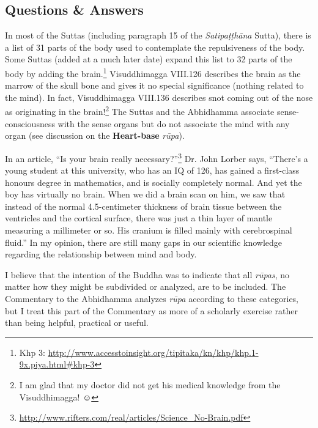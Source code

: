 \newpage

\subsection*{Questions \& Answers}


In most of the Suttas (including paragraph 15 of the \textit{Satipaṭṭhāna} Sutta), there is a list of 31 parts of the body used to contemplate the repulsiveness of the body. Some Suttas (added at a much later date) expand this list to 32 parts of the body by adding the brain.\footnote{Khp 3: \url{http://www.accesstoinsight.org/tipitaka/kn/khp/khp.1-9x.piya.html\#khp-3}} Visuddhimagga VIII.126 describes the brain as the marrow of the skull bone and gives it no special significance (nothing related to the mind). In fact, Visuddhimagga VIII.136 describes snot coming out of the nose as originating in the brain!\footnote{I am glad that my doctor did not get his medical knowledge from the Visuddhimagga! ☺} The Suttas and the Abhidhamma associate sense-consciousness with the sense organs but do not associate the mind with any organ (see discussion on the \textbf{Heart-base} \textit{rūpa}).

In an article, “Is your brain really necessary?”\footnote{\url{http://www.rifters.com/real/articles/Science\_No-Brain.pdf}} Dr. John Lorber says, “There’s a young student at this university, who has an IQ of 126, has gained a first-class honours degree in mathematics, and is socially completely normal. And yet the boy has virtually no brain. When we did a brain scan on him, we saw that instead of the normal 4.5-centimeter thickness of brain tissue between the ventricles and the cortical surface, there was just a thin layer of mantle measuring a millimeter or so. His cranium is filled mainly with cerebrospinal fluid.” In my opinion, there are still many gaps in our scientific knowledge regarding the relationship between mind and body.


I believe that the intention of the Buddha was to indicate that all \textit{rūpas}, no matter how they might be subdivided or analyzed, are to be included. The Commentary to the Abhidhamma analyzes \textit{rūpa} according to these categories, but I treat this part of the Commentary as more of a scholarly exercise rather than being helpful, practical or useful.

